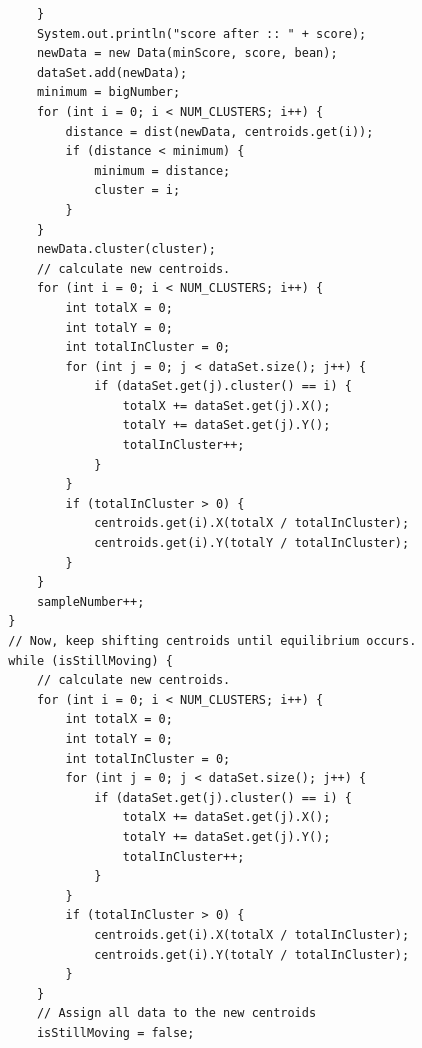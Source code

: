 \documentclass[12pt,a4paper,final]{extreport}
\begin{document}
\begin{lstlisting}
            } 
            System.out.println("score after :: " + score);          
            newData = new Data(minScore, score, bean);
            dataSet.add(newData);
            minimum = bigNumber;
            for (int i = 0; i < NUM_CLUSTERS; i++) { 
                distance = dist(newData, centroids.get(i));
                if (distance < minimum) {
                    minimum = distance;
                    cluster = i;
                }
            }
            newData.cluster(cluster);
            // calculate new centroids.
            for (int i = 0; i < NUM_CLUSTERS; i++) {
                int totalX = 0;
                int totalY = 0;
                int totalInCluster = 0;
                for (int j = 0; j < dataSet.size(); j++) {
                    if (dataSet.get(j).cluster() == i) {
                        totalX += dataSet.get(j).X();
                        totalY += dataSet.get(j).Y();
                        totalInCluster++;
                    }
                }
                if (totalInCluster > 0) {
                    centroids.get(i).X(totalX / totalInCluster);
                    centroids.get(i).Y(totalY / totalInCluster);
                }
            }
            sampleNumber++;
        }
        // Now, keep shifting centroids until equilibrium occurs.
        while (isStillMoving) {
            // calculate new centroids.
            for (int i = 0; i < NUM_CLUSTERS; i++) {
                int totalX = 0;
                int totalY = 0;
                int totalInCluster = 0;
                for (int j = 0; j < dataSet.size(); j++) {
                    if (dataSet.get(j).cluster() == i) {
                        totalX += dataSet.get(j).X();
                        totalY += dataSet.get(j).Y();
                        totalInCluster++;
                    }
                }
                if (totalInCluster > 0) {
                    centroids.get(i).X(totalX / totalInCluster);
                    centroids.get(i).Y(totalY / totalInCluster);
                }
            }
            // Assign all data to the new centroids
            isStillMoving = false;


\end{lstlisting}
\end{document}
